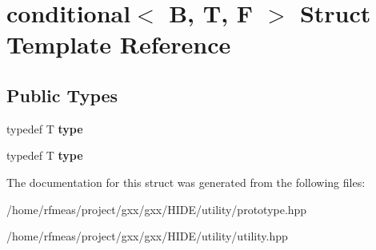 \hypertarget{structconditional}{}\section{conditional$<$ B, T, F $>$ Struct Template Reference}
\label{structconditional}
\subsection*{Public Types}
\begin{DoxyCompactItemize}
\item 
typedef T {\bfseries type}\hypertarget{structconditional_ae1a46055590f8bbe4a08d7476b21e8af}{}\label{structconditional_ae1a46055590f8bbe4a08d7476b21e8af}

\item 
typedef T {\bfseries type}\hypertarget{structconditional_ae1a46055590f8bbe4a08d7476b21e8af}{}\label{structconditional_ae1a46055590f8bbe4a08d7476b21e8af}

\end{DoxyCompactItemize}


The documentation for this struct was generated from the following files\+:\begin{DoxyCompactItemize}
\item 
/home/rfmeas/project/gxx/gxx/\+H\+I\+D\+E/utility/prototype.\+hpp\item 
/home/rfmeas/project/gxx/gxx/\+H\+I\+D\+E/utility/utility.\+hpp\end{DoxyCompactItemize}
